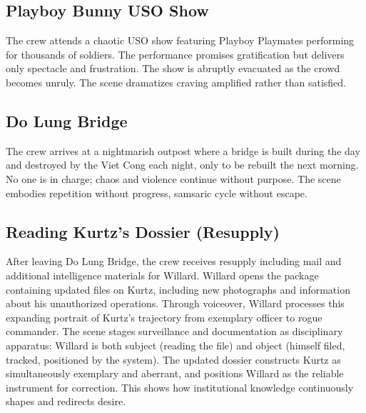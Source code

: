 \begin{minipage}{\textwidth}
	\subsection*{Playboy Bunny USO Show}
	\label{scene:playboy-show}

	The crew attends a chaotic USO show featuring Playboy Playmates performing for thousands of
	soldiers. The performance promises gratification but delivers only spectacle and frustration.
	The show is abruptly evacuated as the crowd becomes unruly. The scene dramatizes craving
	amplified rather than satisfied.
\end{minipage}
\bigskip

\begin{minipage}{\textwidth}
	\subsection*{Do Lung Bridge}
	\label{scene:do-lung-bridge}

	The crew arrives at a nightmarish outpost where a bridge is built during the day and destroyed
	by the Viet Cong each night, only to be rebuilt the next morning. No one is in charge; chaos
	and violence continue without purpose. The scene embodies repetition without progress, samsaric
	cycle without escape.
\end{minipage}
\bigskip

\begin{minipage}{\textwidth}
	\subsection*{Reading Kurtz's Dossier (Resupply)}
	\label{scene:dossier-reading}

	After leaving Do Lung Bridge, the crew receives resupply including mail and additional
	intelligence materials for Willard. Willard opens the package containing updated files on Kurtz,
	including new photographs and information about his unauthorized operations. Through voiceover,
	Willard processes this expanding portrait of Kurtz's trajectory from exemplary officer to rogue
	commander. The scene stages surveillance and documentation as disciplinary apparatus: Willard is
	both subject (reading the file) and object (himself filed, tracked, positioned by the system).
	The updated dossier constructs Kurtz as simultaneously exemplary and aberrant, and positions
	Willard as the reliable instrument for correction. This shows how institutional knowledge
	continuously shapes and redirects desire.
\end{minipage}
\bigskip

